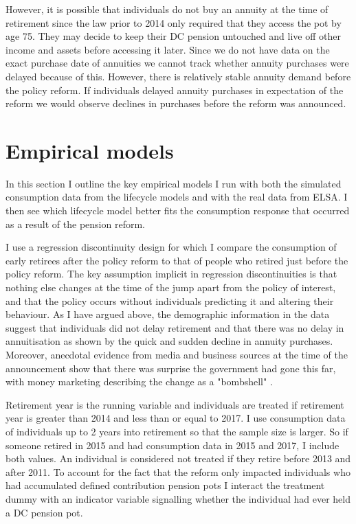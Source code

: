 \documentclass[12pt]{article}
\begin{document}
However, it is possible that individuals do not buy an annuity at the time of retirement since the law prior to 2014 only
required that they access the pot by age 75. They may decide to keep their DC pension untouched
and live off other income and assets before accessing it later. Since we do not have data on the
exact purchase date of annuities we cannot track whether
annuity purchases were delayed because of this. However, there is relatively stable annuity demand
before the policy reform. If individuals delayed annuity purchases in expectation of the reform we
would observe declines in purchases before the reform was announced.


\section{Empirical models}

In this section I outline the key empirical models I run with both the simulated consumption data from the
lifecycle models and with the real data from ELSA. I then see which lifecycle model better fits the consumption
response that occurred as a result of the pension reform.

I use a regression discontinuity design for which I compare the consumption of early retirees after the policy reform
to that of people who retired just before the policy reform. The key assumption implicit in regression discontinuities is
that nothing else changes at the time of the jump apart from the policy of interest, and that the policy occurs
without individuals predicting it and altering their behaviour. As I have argued above, the demographic information in the
data suggest that individuals did not delay retirement and that there was no delay in annuitisation as shown by the quick
and sudden decline in annuity purchases. Moreover, anecdotal evidence from media and business sources at the time of the
announcement show that there was surprise the government had gone this far, with money marketing describing the change as a
"bombshell" \cite{money_marketing_announcement}.

Retirement year is the running variable and individuals are treated if retirement year is greater than 2014 and less than
or equal to 2017. I use consumption data of individuals up to 2 years into retirement so that the sample size is larger.
So if someone retired in 2015 and had consumption data in 2015 and 2017, I include both values. An individual is considered
not treated if they retire before 2013 and after 2011.  To account for the fact
that the reform only impacted individuals who had accumulated defined contribution pension pots I interact the treatment dummy with
an indicator variable signalling whether the individual had ever held a DC pension pot.
\end{document}
